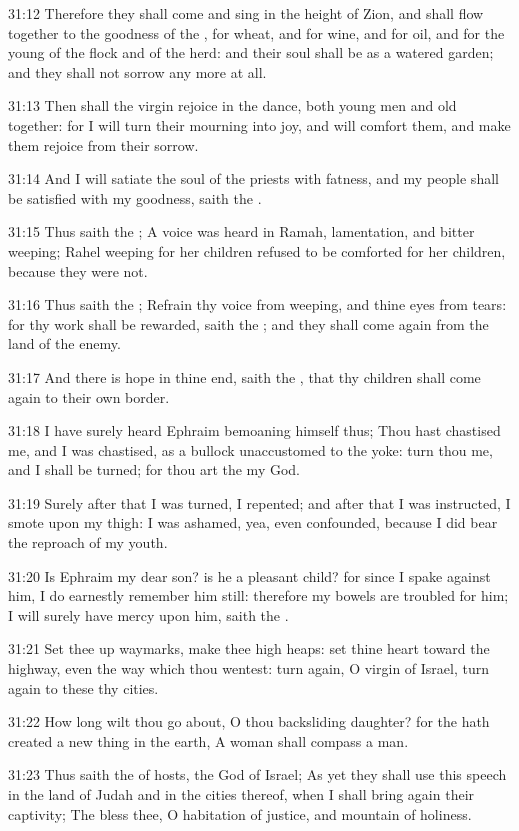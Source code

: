 31:12 Therefore they shall come and sing in the height of Zion, and
shall flow together to the goodness of the \LORD, for wheat, and for
wine, and for oil, and for the young of the flock and of the herd: and
their soul shall be as a watered garden; and they shall not sorrow any
more at all.

31:13 Then shall the virgin rejoice in the dance, both young men and
old together: for I will turn their mourning into joy, and will
comfort them, and make them rejoice from their sorrow.

31:14 And I will satiate the soul of the priests with fatness, and my
people shall be satisfied with my goodness, saith the \LORD.

31:15 Thus saith the \LORD; A voice was heard in Ramah, lamentation,
and bitter weeping; Rahel weeping for her children refused to be
comforted for her children, because they were not.

31:16 Thus saith the \LORD; Refrain thy voice from weeping, and thine
eyes from tears: for thy work shall be rewarded, saith the \LORD; and
they shall come again from the land of the enemy.

31:17 And there is hope in thine end, saith the \LORD, that thy
children shall come again to their own border.

31:18 I have surely heard Ephraim bemoaning himself thus; Thou hast
chastised me, and I was chastised, as a bullock unaccustomed to the
yoke: turn thou me, and I shall be turned; for thou art the \LORD my
God.

31:19 Surely after that I was turned, I repented; and after that I was
instructed, I smote upon my thigh: I was ashamed, yea, even
confounded, because I did bear the reproach of my youth.

31:20 Is Ephraim my dear son? is he a pleasant child? for since I
spake against him, I do earnestly remember him still: therefore my
bowels are troubled for him; I will surely have mercy upon him, saith
the \LORD.

31:21 Set thee up waymarks, make thee high heaps: set thine heart
toward the highway, even the way which thou wentest: turn again, O
virgin of Israel, turn again to these thy cities.

31:22 How long wilt thou go about, O thou backsliding daughter? for
the \LORD hath created a new thing in the earth, A woman shall compass
a man.

31:23 Thus saith the \LORD of hosts, the God of Israel; As yet they
shall use this speech in the land of Judah and in the cities thereof,
when I shall bring again their captivity; The \LORD bless thee, O
habitation of justice, and mountain of holiness.

